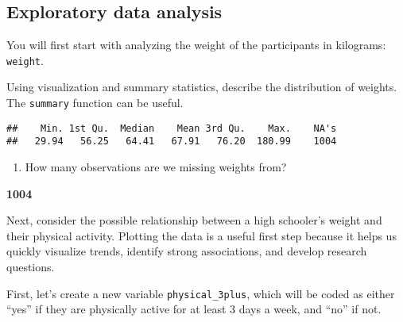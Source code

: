 \documentclass[
]{article}
\newenvironment{Shaded}{\begin{snugshade}}{\end{snugshade}}
\newcommand{\AttributeTok}[1]{\textcolor[rgb]{0.13,0.29,0.53}{#1}}
\newcommand{\DecValTok}[1]{\textcolor[rgb]{0.00,0.00,0.81}{#1}}
\newcommand{\FunctionTok}[1]{\textcolor[rgb]{0.13,0.29,0.53}{\textbf{#1}}}
\newcommand{\NormalTok}[1]{#1}
\newcommand{\OtherTok}[1]{\textcolor[rgb]{0.56,0.35,0.01}{#1}}
\newcommand{\SpecialCharTok}[1]{\textcolor[rgb]{0.81,0.36,0.00}{\textbf{#1}}}
\newcommand{\StringTok}[1]{\textcolor[rgb]{0.31,0.60,0.02}{#1}}
\providecommand{\tightlist}{%
  \setlength{\itemsep}{0pt}\setlength{\parskip}{0pt}}
\begin{document}
\subsection{Exploratory data analysis}\label{exploratory-data-analysis}

You will first start with analyzing the weight of the participants in
kilograms: \texttt{weight}.

Using visualization and summary statistics, describe the distribution of
weights. The \texttt{summary} function can be useful.

\begin{Shaded}
\end{Shaded}

\begin{verbatim}
##    Min. 1st Qu.  Median    Mean 3rd Qu.    Max.    NA's 
##   29.94   56.25   64.41   67.91   76.20  180.99    1004
\end{verbatim}

\begin{enumerate}
\def\labelenumi{\arabic{enumi}.}
\setcounter{enumi}{1}
\tightlist
\item
  How many observations are we missing weights from?
\end{enumerate}

\textbf{1004}

Next, consider the possible relationship between a high schooler's
weight and their physical activity. Plotting the data is a useful first
step because it helps us quickly visualize trends, identify strong
associations, and develop research questions.

First, let's create a new variable \texttt{physical\_3plus}, which will
be coded as either ``yes'' if they are physically active for at least 3
days a week, and ``no'' if not.

\begin{Shaded}
\end{Shaded}
\end{document}
